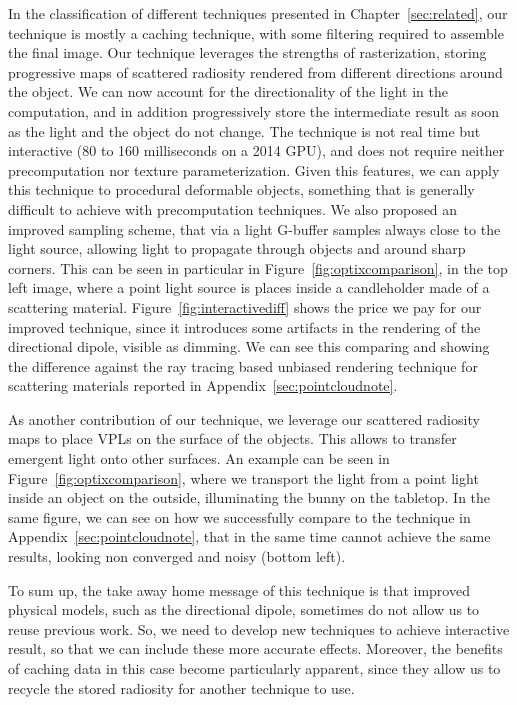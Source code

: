 In the classification of different techniques presented in Chapter~\ref{sec:related}, our technique is mostly a caching technique, with some filtering required to assemble the final image. Our technique leverages the strengths of rasterization, storing progressive maps of scattered radiosity rendered from different directions around the object. We can now account for the directionality of the light in the computation, and in addition progressively store the intermediate result as soon as the light and the object do not change. The technique is not real time but interactive (80 to 160 milliseconds on a 2014 GPU), and does not require neither precomputation nor texture parameterization. Given this features, we can apply this technique to procedural deformable objects, something that is generally difficult to achieve with precomputation techniques. We also proposed an improved sampling scheme, that via a light G-buffer samples always close to the light source, allowing light to propagate through objects and around sharp corners. This can be seen in particular in Figure~\ref{fig:optixcomparison}, in the top left image, where a point light source is places inside a candleholder made of a scattering material. Figure~\ref{fig:interactivediff} shows the price we pay for our improved technique, since it introduces some artifacts in the rendering of the directional dipole, visible as dimming. We can see this comparing and showing the difference against the ray tracing based unbiased rendering technique for scattering materials reported in Appendix~\ref{sec:pointcloudnote}.

As another contribution of our technique, we leverage our scattered radiosity maps to place VPLs on the surface of the objects. This allows to transfer emergent light onto other surfaces. An example can be seen in Figure~\ref{fig:optixcomparison}, where we transport the light from a point light inside an object on the outside, illuminating the bunny on the tabletop. In the same figure, we can see on how we successfully compare to the technique in Appendix~\ref{sec:pointcloudnote}, that in the same time cannot achieve the same results, looking non converged and noisy (bottom left).

To sum up, the take away home message of this technique is that improved physical models, such as the directional dipole, sometimes do not allow us to reuse previous work. So, we need to develop new techniques to achieve interactive result, so that we can include these more accurate effects. Moreover, the benefits of caching data in this case become particularly apparent, since they allow us to recycle the stored radiosity for another technique to use. 

